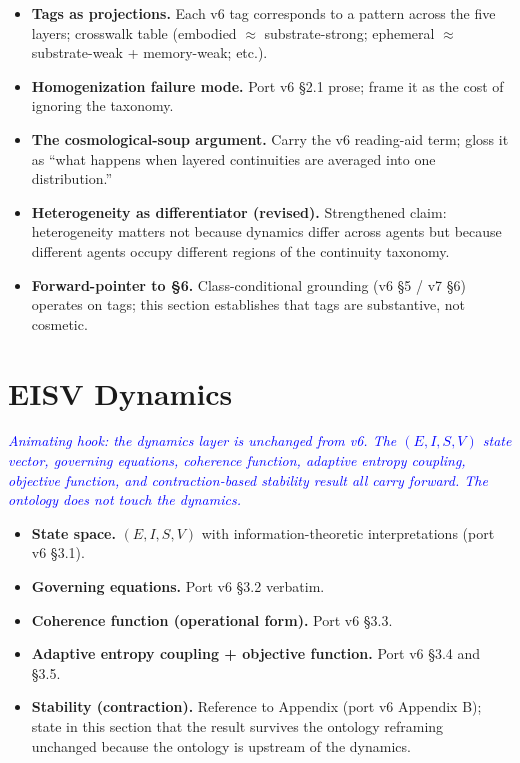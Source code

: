\documentclass[11pt,twocolumn]{article}
\newcommand{\outlinenote}[1]{\textcolor{blue}{\textit{#1}}}
\begin{document}
\begin{itemize}
  \item \textbf{Tags as projections.} Each v6 tag corresponds to
        a pattern across the five layers; crosswalk table
        (embodied $\approx$ substrate-strong; ephemeral $\approx$
        substrate-weak + memory-weak; etc.).
  \item \textbf{Homogenization failure mode.} Port v6 §2.1 prose;
        frame it as the cost of ignoring the taxonomy.
  \item \textbf{The cosmological-soup argument.} Carry the v6
        reading-aid term; gloss it as
        ``what happens when layered continuities are averaged
        into one distribution.''
  \item \textbf{Heterogeneity as differentiator (revised).}
        Strengthened claim: heterogeneity matters not because
        dynamics differ across agents but because different agents
        occupy different regions of the continuity taxonomy.
  \item \textbf{Forward-pointer to §6.} Class-conditional
        grounding (v6 §5 / v7 §6) operates on tags; this section
        establishes that tags are substantive, not cosmetic.
\end{itemize}

\section{EISV Dynamics}
\outlinenote{Animating hook: the dynamics layer is unchanged from
v6. The $(E, I, S, V)$ state vector, governing equations,
coherence function, adaptive entropy coupling, objective function,
and contraction-based stability result all carry forward. The
ontology does not touch the dynamics.}

\begin{itemize}
  \item \textbf{State space.} $(E, I, S, V)$ with information-theoretic
        interpretations (port v6 §3.1).
  \item \textbf{Governing equations.} Port v6 §3.2 verbatim.
  \item \textbf{Coherence function (operational form).} Port v6 §3.3.
  \item \textbf{Adaptive entropy coupling + objective function.}
        Port v6 §3.4 and §3.5.
  \item \textbf{Stability (contraction).} Reference to Appendix
        (port v6 Appendix B); state in this section that the
        result survives the ontology reframing unchanged because
        the ontology is upstream of the dynamics.
\end{itemize}
\end{document}
